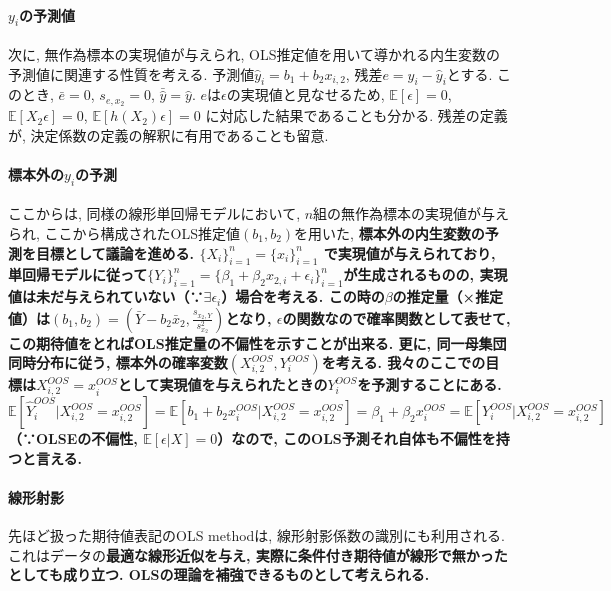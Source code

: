 \documentclass[paper=a4paper,fontsize=10pt]{jlreq}
\begin{document}
\paragraph{$y_i$の予測値}
次に, 無作為標本の実現値が与えられ, OLS推定値を用いて導かれる内生変数の予測値に関連する性質を考える. 予測値$\hat{y}_i=b_1+b_2x_{i, 2}$, 残差$e=y_i-\hat{y}_i$とする. このとき, $\bar{e}=0$, $s_{e, x_2}=0$, $\bar{\hat{y}}=\hat{y}$. $e$は$\epsilon$の実現値と見なせるため, $\mathbb{E}[\epsilon]=0$, $\mathbb{E}[X_{2}\epsilon]=0$, $\mathbb{E}[h(X_{2})\epsilon]=0$ に対応した結果であることも分かる. 残差の定義が, 決定係数の定義の解釈に有用であることも留意.\\

\paragraph{標本外の$y_i$の予測}
ここからは, 同様の線形単回帰モデルにおいて, $n$組の無作為標本の実現値が与えられ, ここから構成されたOLS推定値$(b_1, b_2)$を用いた, \rmfamily\mcfamily\bfseries{標本外}\mdseries の内生変数の予測を目標として議論を進める. $\{X_i\}_{i=1}^{n}=\{x_i\}_{i=1}^{n}$ で実現値が与えられており, 単回帰モデルに従って$\{Y_i\}_{i=1}^{n}=\{\beta_1+\beta_2x_{2,i}+\epsilon_i\}_{i=1}^{n}$が生成されるものの, 実現値は未だ与えられていない（∵$\exists\epsilon_i$）場合を考える. この時の$\beta$の推定量（×推定値）は$(b_1, b_2)=(\bar{Y}-b_2\bar{x}_2, \frac{s_{x_2,Y}}{s^{2}_{x_2}})$となり, $\epsilon$の関数なので確率関数として表せて, この期待値をとればOLS推定量の不偏性を示すことが出来る. 更に, 同一母集団同時分布に従う, 標本外の確率変数$(X_{i,2}^{OOS}, Y_i^{OOS})$を考える. 我々のここでの目標は$X_{i,2}^{OOS}=x_i^{OOS}$として実現値を与えられたときの$Y_i^{OOS}$を予測することにある. $\mathbb{E}[\hat{Y}_i^{OOS}|X_{i,2}^{OOS}=x_{i,2}^{OOS}]=\mathbb{E}[b_1+b_2x_i^{OOS}|X_{i,2}^{OOS}=x_{i,2}^{OOS}]=\beta_1+\beta_2x_i^{OOS}=\mathbb{E}[Y_i^{OOS}|X_{i,2}^{OOS}=x_{i,2}^{OOS}]$（∵OLSEの不偏性, $\mathbb{E}[\epsilon|X]=0$）なので, \rmfamily\mcfamily\bfseries{このOLS予測それ自体も不偏性を持つ}\mdseries と言える.\\

\paragraph{線形射影}
先ほど扱った期待値表記のOLS methodは, 線形射影係数の識別にも利用される. これはデータの\rmfamily\mcfamily\bfseries{最適な線形近似}\mdseries を与え, 実際に条件付き期待値が線形で無かったとしても成り立つ. OLSの理論を補強できるものとして考えられる. \\
\end{document}
